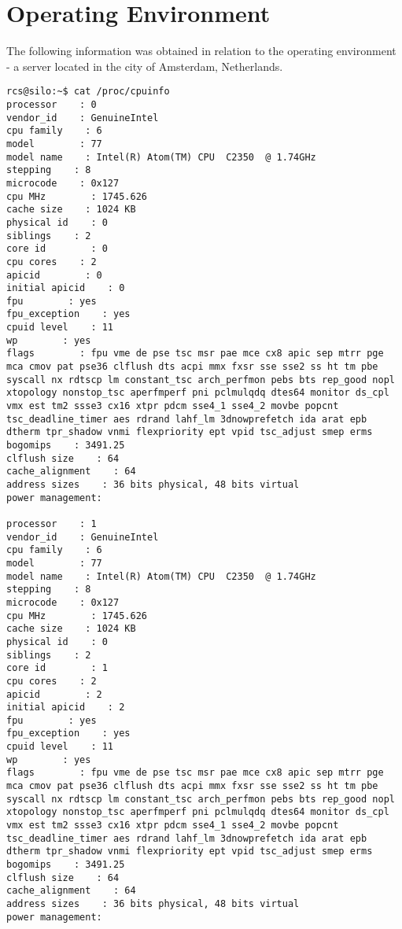 \chapter{Operating Environment}
\label{Operating Environment}

The following information was obtained in relation to the operating environment - a server located in the city of Amsterdam, Netherlands.

\begin{lstlisting}[breaklines]
rcs@silo:~$ cat /proc/cpuinfo 
processor    : 0
vendor_id    : GenuineIntel
cpu family    : 6
model        : 77
model name    : Intel(R) Atom(TM) CPU  C2350  @ 1.74GHz
stepping    : 8
microcode    : 0x127
cpu MHz        : 1745.626
cache size    : 1024 KB
physical id    : 0
siblings    : 2
core id        : 0
cpu cores    : 2
apicid        : 0
initial apicid    : 0
fpu        : yes
fpu_exception    : yes
cpuid level    : 11
wp        : yes
flags        : fpu vme de pse tsc msr pae mce cx8 apic sep mtrr pge mca cmov pat pse36 clflush dts acpi mmx fxsr sse sse2 ss ht tm pbe syscall nx rdtscp lm constant_tsc arch_perfmon pebs bts rep_good nopl xtopology nonstop_tsc aperfmperf pni pclmulqdq dtes64 monitor ds_cpl vmx est tm2 ssse3 cx16 xtpr pdcm sse4_1 sse4_2 movbe popcnt tsc_deadline_timer aes rdrand lahf_lm 3dnowprefetch ida arat epb dtherm tpr_shadow vnmi flexpriority ept vpid tsc_adjust smep erms
bogomips    : 3491.25
clflush size    : 64
cache_alignment    : 64
address sizes    : 36 bits physical, 48 bits virtual
power management:

processor    : 1
vendor_id    : GenuineIntel
cpu family    : 6
model        : 77
model name    : Intel(R) Atom(TM) CPU  C2350  @ 1.74GHz
stepping    : 8
microcode    : 0x127
cpu MHz        : 1745.626
cache size    : 1024 KB
physical id    : 0
siblings    : 2
core id        : 1
cpu cores    : 2
apicid        : 2
initial apicid    : 2
fpu        : yes
fpu_exception    : yes
cpuid level    : 11
wp        : yes
flags        : fpu vme de pse tsc msr pae mce cx8 apic sep mtrr pge mca cmov pat pse36 clflush dts acpi mmx fxsr sse sse2 ss ht tm pbe syscall nx rdtscp lm constant_tsc arch_perfmon pebs bts rep_good nopl xtopology nonstop_tsc aperfmperf pni pclmulqdq dtes64 monitor ds_cpl vmx est tm2 ssse3 cx16 xtpr pdcm sse4_1 sse4_2 movbe popcnt tsc_deadline_timer aes rdrand lahf_lm 3dnowprefetch ida arat epb dtherm tpr_shadow vnmi flexpriority ept vpid tsc_adjust smep erms
bogomips    : 3491.25
clflush size    : 64
cache_alignment    : 64
address sizes    : 36 bits physical, 48 bits virtual
power management:


\end{lstlisting}
